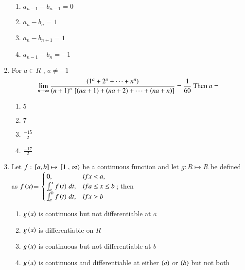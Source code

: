 \documentclass[journal]{IEEEtran}
\numberwithin{equation}{enumi}
\numberwithin{figure}{enumi}
\begin{document}
\begin{enumerate}
\begin{enumerate}
        \item $a_{n-1}-b_{n-1}=0$ 
        \item $a_n-b_n=1$ 
        \item $a_n-b_{n+1}=1$ 
        \item $a_{n-1}-b_n=-1$ 
    \end{enumerate}


    \item 
	    For $a\in R$ , $a\neq -1$ 
    \begin{align*}
	    \lim_{n\to\infty}\frac{\left(1^a+2^a+\cdots+n^a\right)}{\left(n+1\right)^a{}\left[\left(na+1\right)+\left(na+2\right)+\cdots+\left(na+n\right)\right]}
	    =\frac{1}{60} \text{ Then } a=
    \end{align*}

    \hfill{}
    
    \begin{multicols}{4}
    \begin{enumerate}
        
        \item $5$
        \item $7$ 
        \item $\frac{-15}{2}$ 
        \item $\frac{-17}{2}$ 
    \end{enumerate}
    \end{multicols}


    \item 
    Let $f: {}\left[a,b\right]\mapsto {}\left[1\right.,\left.\infty\right)$ be a continuous function and let $g: R\mapsto R$ be defined as 
    $f\left(x\right)$= 
    $\begin{cases}
       0, & if x<a, \\
       \int_{a}^{x}{f\left(t\right) \, dt}, & if a\leq x\leq b \\
       \int_{a}^{b}{f\left(t\right) \, dt}, & if x>b
    \end{cases}$; then 

    \hfill{}
    
    \begin{enumerate}
        
        \item $g\left(x\right)$ is continuous but not differentiable at $a$
        \item $g\left(x\right)$ is differentiable on $R$
        \item $g\left(x\right)$ is continuous but not differentiable at $b$
        \item $g\left(x\right)$ is continuous and differentiable at either $\left(a\right)$ or $\left(b\right)$ but not both 
    \end{enumerate}



\end{enumerate}
\end{document}
